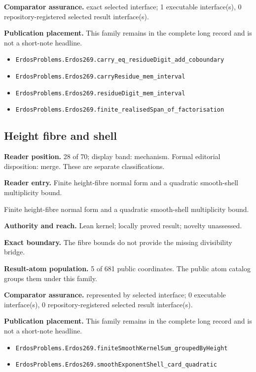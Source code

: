 \documentclass[11pt]{article}
\begin{document}
\textbf{Comparator assurance.} exact selected interface; 1 executable interface(s), 0 repository-registered selected result interface(s).

\textbf{Publication placement.} This family remains in the complete long record and is not a short-note headline.

\begin{itemize}
  \item \nolinkurl{ErdosProblems.Erdos269.carry_eq_residueDigit_add_coboundary}
  \item \nolinkurl{ErdosProblems.Erdos269.carryResidue_mem_interval}
  \item \nolinkurl{ErdosProblems.Erdos269.residueDigit_mem_interval}
  \item \nolinkurl{ErdosProblems.Erdos269.finite_realisedSpan_of_factorisation}
\end{itemize}

\subsection{Height fibre and shell}
\textbf{Reader position.} 28 of 70; display band: mechanism.  Formal editorial disposition: merge.  These are separate classifications.

\textbf{Reader entry.} Finite height-fibre normal form and a quadratic smooth-shell multiplicity bound.

Finite height-fibre normal form and a quadratic smooth-shell multiplicity bound.

\textbf{Authority and reach.} Lean kernel; locally proved result; novelty unassessed.

\textbf{Exact boundary.} The fibre bounds do not provide the missing divisibility bridge.

\textbf{Result-atom population.} 5 of 681 public coordinates. The public atom catalog groups them under this family.

\textbf{Comparator assurance.} represented by selected interface; 0 executable interface(s), 0 repository-registered selected result interface(s).

\textbf{Publication placement.} This family remains in the complete long record and is not a short-note headline.

\begin{itemize}
  \item \nolinkurl{ErdosProblems.Erdos269.finiteSmoothKernelSum_groupedByHeight}
  \item \nolinkurl{ErdosProblems.Erdos269.smoothExponentShell_card_quadratic}
\end{itemize}
\end{document}
